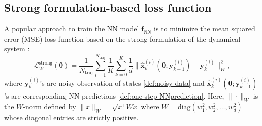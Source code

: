 \documentclass[final]{siamltex}
\newcommand{\jrp}[1]{{\color{orange}{#1}}}
\newcommand{\bfa}[1]{\boldsymbol{#1}}
\def\norm#1{\|#1\|}
\begin{document}
\subsection{Strong formulation-based loss function}\label{sec:strong_form}
A popular approach to train the NN model $\bfa{f}_\text{NN}$ is to minimize the mean squared error (MSE) loss function based on the strong formulation of the dynamical system \cite{zhang2022gfinns,hernandez2021structure,lee2021machine}:
\begin{equation} \label{def:strong-form-loss}
\mathcal{L}_W^\text{strong}(\bfa{\theta}) = \frac{1}{N_{\text{traj}}} \sum\limits_{i=1}^{N_\text{traj}} \frac{1}{K} \sum\limits_{k=0}^{K} \frac{1}{d}\norm{\widehat{\bfa{x}}^{(i)}_k(\bfa{\theta};\bfa{y}^{(i)}_{k-1}) - \bfa{y}^{(i)}_k}_{W}^2,
\end{equation}
where $\bfa{y}^{(i)}_k$'s are noisy observation of states \eqref{def:noisy-data} and $\widehat{\bfa{x}}^{(i)}_k(\bfa{\theta};\bfa{y}^{(i)}_{k-1})$'s are corresponding NN predictions \eqref{def:one-step-NNprediction}.
Here, $\|\cdot\|_W$ is the $W$-norm defined by $\|x\|_W = \sqrt{x^\top Wx}$ where $W = \text{diag}(w_1^2, w_2^2, \ldots, w_d^2)$ whose diagonal entries are strictly positive.

\end{document}
